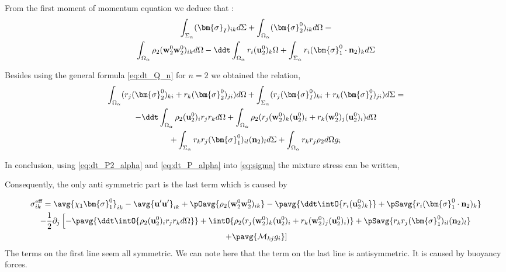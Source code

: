 From the first  moment of momentum equation we deduce that : 
\begin{multline}
    \int_{\Sigma_\alpha} 
    (\bm{\sigma}_I)_{ik}
    d\Sigma
    +\int_{\Omega_\alpha} 
    (\bm{\sigma}_2^0)_{ik}
    d\Omega
    = \\
    \int_{\Omega_\alpha} \rho_2 
    (\textbf{w}_2^0\textbf{w}_2^0  )_{ik}
    d\Omega
    -\ddt \int_{\Omega_\alpha} r_i (\textbf{u}^0_2)_k \Omega
    +\int_{\Sigma_\alpha} 
     r_i (\bm{\sigma}_1^0 \cdot \textbf{n}_2)_{k}
    d\Sigma
    \label{eq:dt_P_alpha}
\end{multline}

Besides using the general formula \ref{eq:dt_Q_n} for $n = 2$ we obtained the relation, 
\begin{multline}
    \int_{\Omega_\alpha} (r_{j}(\bm{\sigma}^0_2)_{ki}+r_{k}(\bm{\sigma}^0_2)_{ji})d\Omega
    +\int_{\Sigma_\alpha} (r_{j}(\bm{\sigma}^0_I)_{ki}+r_{k}(\bm{\sigma}_I^0)_{ji})d\Sigma
    = \\
    - \ddt\int_{\Omega_\alpha} \rho_2 (\textbf{u}_2^0)_i r_j r_k d\Omega
    + \int_{\Omega_\alpha} \rho_2 (r_{j} (\textbf{w}_2^0)_k (\textbf{u}^0_2)_i + r_k (\textbf{w}_2^0)_j (\textbf{u}^0_2)_i)d\Omega\\
    +\int_{\Sigma_\alpha}  r_{k}r_{j} (\bm{\sigma}_1^0)_{il} (\textbf{n}_2)_l d\Sigma
    + \int_{\Omega_\alpha} r_{k}r_{j}  \rho_2 d\Omega g_i
    \label{eq:dt_P2_alpha}
\end{multline}

In conclusion, using \ref{eq:dt_P2_alpha} and \ref{eq:dt_P_alpha} into \ref{eq:sigma} the mixture stress can be written,

Consequently, the only anti symmetric part is the last term which is caused by

\begin{multline*}
    \sigma_{ik}^\text{eff}
    = \avg{\chi_1 \bm{\sigma}^0_1}_{ik} 
    - \avg{\textbf{u}'\textbf{u}'}_{ik}
    + \pOavg{ \rho_2 (\textbf{w}_2^0\textbf{w}_2^0  )_{ik}}
    -\pavg{\ddt \intO{ r_i (\textbf{u}^0_2)_k }}
    +\pSavg{ r_i (\bm{\sigma}_1^0 \cdot \textbf{n}_2)_{k}}\\
    - \frac{1}{2}\partial_j \left[
        - \pavg{
        \ddt \intO{ \rho_2 (\textbf{u}_2^0)_i r_j r_k d\Omega}}
            + \intO{\rho_2 (r_{j} (\textbf{w}_2^0)_k (\textbf{u}^0_2)_i + r_k (\textbf{w}_2^0)_j (\textbf{u}^0_2)_i)} 
            + \pSavg{ r_{k}r_{j} (\bm{\sigma}_1^0)_{il} (\textbf{n}_2)_l }
                \right. \\ \left.
                + \pavg{\mathcal{M}_{kj}   g_i}
    \right]
\end{multline*}
The terms on the first line seem all symmetric. 
We can note here that the term on the last line is antisymmetric. 
It is caused by buoyancy forces. 



